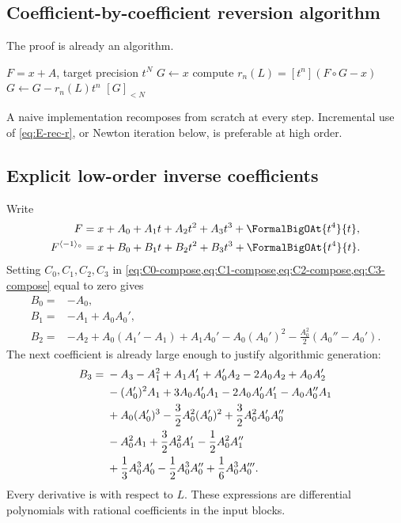 \documentclass[11pt]{article}
\theoremstyle{pltheorem}
\newcommand{\K}{\mathbb K}
\newcommand{\Gnear}{\NearIdentityPolynomialLogGroup{\K}}
\newcommand{\rev}{\langle-1\rangle_{\circ}}
\newcommand{\compose}{\mathbin{\circ}}
\begin{document}
\subsection{Coefficient-by-coefficient reversion algorithm}

The proof is already an algorithm.

\begin{algorithm}[htbp]
\caption{Triangular reversion in \(\Gnear\)}
\label{alg:triangular-reversion}
\begin{algorithmic}[1]
\Require \(F=x+A\), target precision \(t^N\)
\State \(G\gets x\)
  \State compute \(r_n(L)=[t^n](F\compose G-x)\)
  \State \(G\gets G-r_n(L)t^n\)
\EndFor
\State \Return \([G]_{<N}\)
\end{algorithmic}
\end{algorithm}

A naive implementation recomposes from scratch at every step.  Incremental use of \cref{eq:E-rec-r}, or Newton iteration below, is preferable at high order.

\subsection{Explicit low-order inverse coefficients}

Write
\begin{align}
 F={}&x+A_0+A_1t+A_2t^2+A_3t^3+\FormalBigOAt{t^4}{t},\label{eq:F-inverse-low}\\
 F^{\rev}={}&x+B_0+B_1t+B_2t^2+B_3t^3+\FormalBigOAt{t^4}{t}.
 \label{eq:G-inverse-low}
\end{align}
Setting \(C_0,C_1,C_2,C_3\) in
\cref{eq:C0-compose,eq:C1-compose,eq:C2-compose,eq:C3-compose} equal to zero gives
\begin{align}
 B_0={}&-A_0,\label{eq:B0-inverse}\\
 B_1={}&-A_1+A_0A_0',\label{eq:B1-inverse}\\
 B_2={}&-A_2+A_0(A_1'-A_1)+A_1A_0'
 -A_0(A_0')^2
 -\frac{A_0^2}{2}(A_0''-A_0').
 \label{eq:B2-inverse}
\end{align}
The next coefficient is already large enough to justify algorithmic generation:
\begin{align}
 B_3={}&-A_3-A_1^2+A_1A_1'+A_0'A_2-2A_0A_2+A_0A_2'
 \notag\\
 &-(A_0')^2A_1+3A_0A_0'A_1-2A_0A_0'A_1'-A_0A_0''A_1
 \notag\\
 &+A_0(A_0')^3-\frac32A_0^2(A_0')^2
 +\frac32A_0^2A_0'A_0''
 \notag\\
 &-A_0^2A_1+\frac32A_0^2A_1'-\frac12A_0^2A_1''
 \notag\\
 &+\frac13A_0^3A_0'-\frac12A_0^3A_0''
 +\frac16A_0^3A_0'''.
 \label{eq:B3-inverse}
\end{align}
Every derivative is with respect to \(L\).  These expressions are differential polynomials with rational coefficients in the input blocks.
\end{document}
